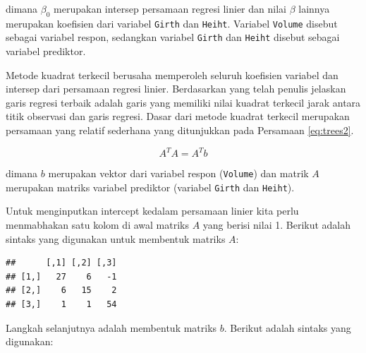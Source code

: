 \documentclass[]{book}
\newenvironment{Shaded}{\begin{snugshade}}{\end{snugshade}}
\newcommand{\CommentTok}[1]{\textcolor[rgb]{0.56,0.35,0.01}{\textit{#1}}}
\newcommand{\DataTypeTok}[1]{\textcolor[rgb]{0.13,0.29,0.53}{#1}}
\newcommand{\DecValTok}[1]{\textcolor[rgb]{0.00,0.00,0.81}{#1}}
\newcommand{\KeywordTok}[1]{\textcolor[rgb]{0.13,0.29,0.53}{\textbf{#1}}}
\newcommand{\NormalTok}[1]{#1}
\newcommand{\OperatorTok}[1]{\textcolor[rgb]{0.81,0.36,0.00}{\textbf{#1}}}
\newcommand{\StringTok}[1]{\textcolor[rgb]{0.31,0.60,0.02}{#1}}
\theoremstyle{definition}
\theoremstyle{definition}
\theoremstyle{definition}
\theoremstyle{remark}
\begin{document}
dimana \(\beta_0\) merupakan intersep persamaan regresi linier dan nilai \(\beta\) lainnya merupakan koefisien dari variabel \texttt{Girth} dan \texttt{Heiht}. Variabel \texttt{Volume} disebut sebagai variabel respon, sedangkan variabel \texttt{Girth} dan \texttt{Heiht} disebut sebagai variabel prediktor.

Metode kuadrat terkecil berusaha memperoleh seluruh koefisien variabel dan intersep dari persamaan regresi linier. Berdasarkan yang telah penulis jelaskan garis regresi terbaik adalah garis yang memiliki nilai kuadrat terkecil jarak antara titik observasi dan garis regresi. Dasar dari metode kuadrat terkecil merupakan persamaan yang relatif sederhana yang ditunjukkan pada Persamaan \eqref{eq:trees2}.

\begin{equation}
A^{T}A=A^{T}b
 \label{eq:trees2}
\end{equation}

dimana \(b\) merupakan vektor dari variabel respon (\texttt{Volume}) dan matrik \(A\) merupakan matriks variabel prediktor (variabel \texttt{Girth} dan \texttt{Heiht}).

Untuk menginputkan intercept kedalam persamaan linier kita perlu menmabhakan satu kolom di awal matriks \(A\) yang berisi nilai 1. Berikut adalah sintaks yang digunakan untuk membentuk matriks \(A\):

\begin{Shaded}
\end{Shaded}

\begin{verbatim}
##      [,1] [,2] [,3]
## [1,]   27    6   -1
## [2,]    6   15    2
## [3,]    1    1   54
\end{verbatim}

Langkah selanjutnya adalah membentuk matriks \(b\). Berikut adalah sintaks yang digunakan:

\begin{Shaded}
\end{Shaded}
\end{document}
